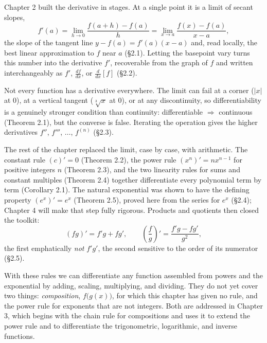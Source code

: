 \documentclass[a4paper,12pt,oneside]{memoir}
\begin{document}
Chapter 2 built the derivative in stages. At a single point it is a limit of secant slopes, \[ f'(a) = \lim_{h \to 0} \frac{f(a + h) - f(a)}{h} = \lim_{x \to a} \frac{f(x) - f(a)}{x - a}, \] the slope of the tangent line \(y - f(a) = f'(a)(x - a)\) and, read locally, the best linear approximation to \(f\) near \(a\) (§2.1). Letting the basepoint vary turns this number into the derivative \(f'\), recoverable from the graph of \(f\) and written interchangeably as \(f'\), \(\tfrac{df}{dx}\), or \(\tfrac{d}{dx}[f]\) (§2.2).

Not every function has a derivative everywhere. The limit can fail at a corner (\(\lvert x \rvert\) at \(0\)), at a vertical tangent (\(\sqrt[3]{x}\) at \(0\)), or at any discontinuity, so differentiability is a genuinely stronger condition than continuity: differentiable \(\Rightarrow\) continuous (Theorem 2.1), but the converse is false. Iterating the operation gives the higher derivatives \(f''\), \(f'''\), \(\dots\), \(f^{(n)}\) (§2.3).

The rest of the chapter replaced the limit, case by case, with arithmetic. The constant rule \((c)' = 0\) (Theorem 2.2), the power rule \((x^{n})' = n x^{n - 1}\) for positive integers \(n\) (Theorem 2.3), and the two linearity rules for sums and constant multiples (Theorem 2.4) together differentiate every polynomial term by term (Corollary 2.1). The natural exponential was shown to have the defining property \((e^{x})' = e^{x}\) (Theorem 2.5), proved here from the series for \(e^{x}\) (§2.4); Chapter 4 will make that step fully rigorous. Products and quotients then closed the toolkit: \[ (fg)' = f'g + fg', \qquad \left(\frac{f}{g}\right)' = \frac{f'g - fg'}{g^{2}}, \] the first emphatically \emph{not} \(f'g'\), the second sensitive to the order of its numerator (§2.5).

With these rules we can differentiate any function assembled from powers and the exponential by adding, scaling, multiplying, and dividing. They do not yet cover two things: \emph{composition}, \(f\bigl(g(x)\bigr)\), for which this chapter has given no rule, and the power rule for exponents that are not integers. Both are addressed in Chapter 3, which begins with the chain rule for compositions and uses it to extend the power rule and to differentiate the trigonometric, logarithmic, and inverse functions.
\end{document}
